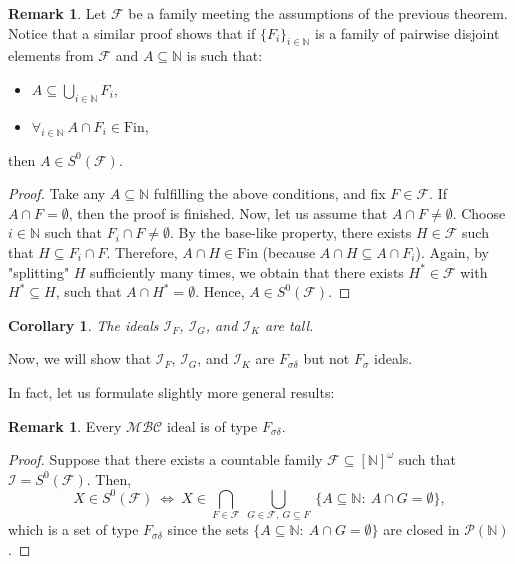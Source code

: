 \documentclass{amsart}
\newtheorem{cor}[thm]{Corollary}
\theoremstyle{definition}
\newtheorem{remark}[thm]{Remark}
\newcommand{\N}{{\mathbb N}}
\newcommand{\Fin}{\textrm{Fin}}
\newcommand{\I}{\mathcal I}
\newcommand{\InfSubs}{[\N]^{\omega}}
\newcommand{\MB}{S^0}
\newcommand{\MBC}{\mathcal{MBC}}
\begin{document}
\begin{remark}\label{remtall+}
Let $\mathcal{F}$ be a family meeting the assumptions of the previous theorem.
Notice that a similar proof shows that if $\{F_i\}_{i\in\N}$ is a family of pairwise disjoint elements from $\mathcal{F}$ and $A\subseteq \N$ is such that:
\begin{itemize}
	\item $A\subseteq \bigcup_{i\in\N}{F_i}$,
	\item $\forall_{i\in\N}\ A\cap F_i\in\Fin$,
\end{itemize}
then $A\in\MB(\mathcal{F})$.
\end{remark}

\begin{proof}
Take any $A\subseteq\N$ fulfilling the above conditions, and fix $F\in\mathcal{F}$. If $A\cap F=\emptyset$, then the proof is finished. Now, let us assume that $A\cap F \neq\emptyset$. Choose $i\in\N$ such that $F_i\cap F \neq\emptyset$. By the base-like property, there exists $H\in\mathcal{F}$ such that $H\subseteq F_i\cap F$. Therefore, $A\cap H\in\Fin$ (because $A\cap H\subseteq A\cap F_i$). Again, by "splitting" $H$ sufficiently many times, we obtain that there exists $H^*\in\mathcal{F}$ with $H^*\subseteq H$, such that $A\cap H^* =\emptyset$. Hence, $A\in\MB(\mathcal{F})$.
\end{proof}

\begin{cor} \label{tall}
The ideals $\I_F$, $\I_G$, and $\I_K$ are tall.
\end{cor}


Now, we will show that $\I_F$, $\I_G$, and $\I_K$ are $F_{\sigma\delta}$ but not $F_{\sigma}$ ideals.

In fact, let us formulate slightly more general results:

\begin{remark}
Every $\MBC$ ideal is of type $F_{\sigma\delta}$.
\end{remark}

\begin{proof}
Suppose that there exists a countable family $\mathcal{F}\subseteq \InfSubs$ such that $\I = \MB(\mathcal{F})$. Then,
$$X\in \MB(\mathcal{F})\ \Longleftrightarrow\ X\in \bigcap_{F\in\mathcal{F}}\ \bigcup_{G\in\mathcal{F},\ G\subseteq F}\ \{A\subseteq\N :\ A\cap G=\emptyset\},$$
which is a set of type $F_{\sigma\delta}$ since the sets $\{A\subseteq\N :\ A\cap G=\emptyset\}$ are closed in $\mathcal{P}(\N)$.
\end{proof}
\end{document}
